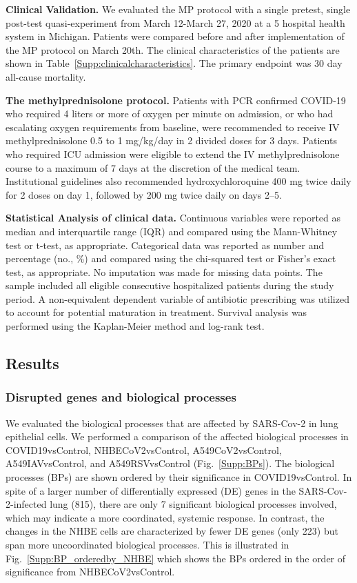 \textbf{Clinical Validation.} 
We evaluated the MP protocol with a single pretest, single post-test quasi-experiment from March 12-March 27, 2020 at a 5 hospital health system in Michigan. Patients were compared before and after implementation of the MP protocol on March 20th. The clinical characteristics of the patients are shown in Table~\ref{Supp:clinicalcharacteristics}. 
The primary endpoint was 30 day all-cause mortality.  

\textbf{The methylprednisolone protocol.}  
Patients with PCR confirmed COVID-19 who required 4 liters or more of oxygen per minute on admission, or who had escalating oxygen requirements from baseline, were recommended to receive IV methylprednisolone 0.5 to 1 mg/kg/day in 2 divided doses for 3 days. Patients who required ICU admission were eligible to extend the IV methylprednisolone course to a maximum of 7 days at the discretion of the medical team. Institutional guidelines also recommended hydroxychloroquine 400 mg twice daily for 2 doses on day 1, followed by 200 mg twice daily on days 2--5.

\textbf{Statistical Analysis of clinical data.} Continuous variables were reported as median and interquartile range (IQR) and compared using the Mann-Whitney test or t-test, as appropriate. Categorical data was reported as number and percentage (no., \%) and compared using the chi-squared test or Fisher's exact test, as appropriate. No imputation was made for missing data points. The sample included all eligible consecutive hospitalized patients during the study period. A non-equivalent dependent variable of antibiotic prescribing was utilized to account for potential maturation in treatment. Survival analysis was performed using the Kaplan-Meier method and log-rank test. 






\subsection{Results}
\subsubsection{Disrupted genes and biological processes} 

We evaluated the biological processes that are affected by SARS-Cov-2 in lung epithelial cells.  We performed a  comparison of the affected biological processes in COVID19vsControl, NHBECoV2vsControl, A549CoV2vsControl, A549IAVvsControl, and A549RSVvsControl (Fig.~\ref{Supp:BPs}). 
The biological processes (BPs) are shown ordered by their significance  in  COVID19vsControl.  
In spite of a larger number of differentially expressed (DE) genes in the SARS-Cov-2-infected lung (815), there are only 7 significant biological processes involved, which may indicate a more coordinated, systemic response. In contrast, the changes in the NHBE cells are characterized by fewer DE genes (only 223) but span more uncoordinated biological processes. 
This is illustrated in Fig.~\ref{Supp:BP_orderedby_NHBE} which shows the BPs ordered in the order of significance from NHBECoV2vsControl.

